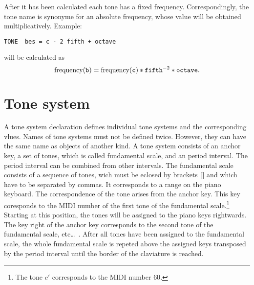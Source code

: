 After it has been calculated each tone has a fixed
frequency. Correspondingly, the tone name is synonyme for an absolute
frequency, whose value will be obtained
multiplicatively. Example:
\begin{lstlisting} 
TONE  bes = c - 2 fifth + octave 
\end{lstlisting}
will be calculated as 
\[
\text{frequency}(\texttt{b}) = \text{frequency}(\texttt{c}) *
\texttt{fifth}^{-2} * \texttt{octave}.
\]
\iffalse
Sämtliche Töne ergeben nach deren Berechnung immer eine feste Frequenz.
Ein Tonname steht also als Synonym für eine
absolute Frequenz\index{Frequenz!absolute}, deren
Wert sich multiplikativ ergibt. Beispiel:
\begin{lstlisting} 
TON  b = c - 2 quint + oktave 
\end{lstlisting}
wird berechnet als \[Frequenz(\mathtt{b}) = Frequenz(\mathtt{c}) *
\mathtt{quint}^{-2} * \mathtt{oktave}\].
\fi





\chapter{Tone system}\label{cha:tonsystem}
 A tone system declaration defines individual tone
systems and the corresponding vlues. Names of tone systems must not be
defined twice. However, they can have the same name as objects of
another kind. A tone system consists of an anchor key, a set of tones, which is called fundamental scale, and an
period interval. The period interval
can be combined from other intervals. The fundamental scale consists
of a sequence of tones, wich must be eclosed by brackets
\textbf{[]} and which have to be separated by
commas. It corresponds to a range on the piano keyboard. The
correspondence of the tone arises from the anchor key. This key
coresponds to the MIDI number of the first tone of
the fundamental scale.\footnote{The tone $c'$ corresponds to the MIDI
  number $60$.}
Starting at this position, the tones will be assigned to the piano
keys rightwards. The key right of the anchor key corresponds to the
second tone of the fundamental scale, etc\ldots\ . After all tones
have been assigned to the fundamental scale, the whole fundamental
scale is repeted above the assigned keys transposed by the period
interval\label{period interval} until the border of the claviature is
reached.

